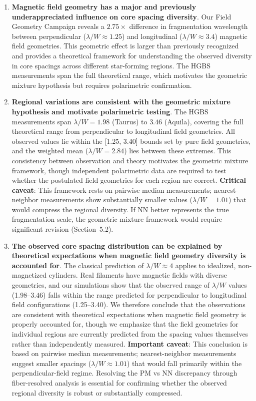 \documentclass[twoside,twocolumn]{mnras}
\begin{document}
\begin{enumerate}
    \item \textbf{Magnetic field geometry has a major and previously underappreciated influence on core spacing diversity}. Our Field Geometry Campaign reveals a $2.75\times$ difference in fragmentation wavelength between perpendicular ($\lambda/W \approx 1.25$) and longitudinal ($\lambda/W \approx 3.4$) magnetic field geometries. This geometric effect is larger than previously recognized and provides a theoretical framework for understanding the observed diversity in core spacings across different star-forming regions. The HGBS measurements span the full theoretical range, which motivates the geometric mixture hypothesis but requires polarimetric confirmation.

    \item \textbf{Regional variations are consistent with the geometric mixture hypothesis and motivate polarimetric testing}. The HGBS measurements span $\lambda/W = 1.98$ (Taurus) to $3.46$ (Aquila), covering the full theoretical range from perpendicular to longitudinal field geometries. All observed values lie within the [1.25, 3.40] bounds set by pure field geometries, and the weighted mean ($\lambda/W = 2.84$) lies between these extremes. This consistency between observation and theory motivates the geometric mixture framework, though independent polarimetric data are required to test whether the postulated field geometries for each region are correct. \textbf{Critical caveat}: This framework rests on pairwise median measurements; nearest-neighbor measurements show substantially smaller values ($\lambda/W = 1.01$) that would compress the regional diversity. If NN better represents the true fragmentation scale, the geometric mixture framework would require significant revision (Section~5.2).

    \item \textbf{The observed core spacing distribution can be explained by theoretical expectations when magnetic field geometry diversity is accounted for}. The classical prediction of $\lambda/W \approx 4$ applies to idealized, non-magnetized cylinders. Real filaments have magnetic fields with diverse geometries, and our simulations show that the observed range of $\lambda/W$ values (1.98--$3.46$) falls within the range predicted for perpendicular to longitudinal field configurations (1.25--3.40). We therefore conclude that the observations are consistent with theoretical expectations when magnetic field geometry is properly accounted for, though we emphasize that the field geometries for individual regions are currently predicted from the spacing values themselves rather than independently measured. \textbf{Important caveat}: This conclusion is based on pairwise median measurements; nearest-neighbor measurements suggest smaller spacings ($\lambda/W \approx 1.01$) that would fall primarily within the perpendicular-field regime. Resolving the PM vs NN discrepancy through fiber-resolved analysis is essential for confirming whether the observed regional diversity is robust or substantially compressed.


\end{enumerate}
\end{document}
